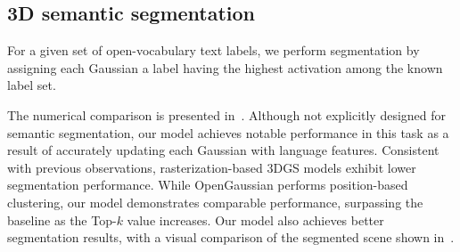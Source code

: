 \subsection{3D semantic segmentation}
\label{subsec:5_3}

For a given set of open-vocabulary text labels, we perform segmentation by assigning each Gaussian a label having the highest activation among the known label set.

The numerical comparison is presented in~. Although not explicitly designed for semantic segmentation, our model achieves notable performance in this task as a result of accurately updating each Gaussian with language features. Consistent with previous observations, rasterization-based 3DGS models exhibit lower segmentation performance. While OpenGaussian performs position-based clustering, our model demonstrates comparable performance, surpassing the baseline as the Top-$k$ value increases. Our model also achieves better segmentation results, with a visual comparison of the segmented scene shown in~.